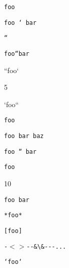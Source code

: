 
\def\mytitle{Code Spans}


\texttt{foo}

\texttt{foo ` bar}

\texttt{``}

\texttt{foo``bar}

``foo`

5

`foo``

\texttt{foo}

\texttt{foo   bar
baz}

\texttt{foo `` bar}

\texttt{foo}

10

\texttt{foo   bar}

\texttt{*foo*}

\texttt{[foo]}

\texttt{-$<$$>$-{}-\&\textbackslash{}\&-{}-{}-...}

\texttt{`foo`}




